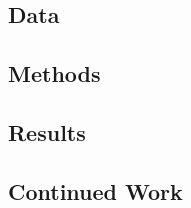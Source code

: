 \subsection{Data}
\label{sec:data}

\subsection{Methods}
\label{subsec:agu-methods}

\subsection{Results}
\label{sec:results}

% 
\subsection{Continued Work}
\label{subsec:agu-conclusion}



